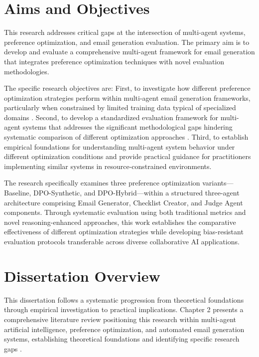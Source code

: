 \section{Aims and Objectives}

This research addresses critical gaps at the intersection of multi-agent systems, preference optimization, and email generation evaluation. The primary aim is to develop and evaluate a comprehensive multi-agent framework for email generation that integrates preference optimization techniques with novel evaluation methodologies.

The specific research objectives are: First, to investigate how different preference optimization strategies perform within multi-agent email generation frameworks, particularly when constrained by limited training data typical of specialized domains \cite{feng2024dpo_limitations}. Second, to develop a standardized evaluation framework for multi-agent systems that addresses the significant methodological gaps hindering systematic comparison of different optimization approaches \cite{li2024generation_to_judgment}. Third, to establish empirical foundations for understanding multi-agent system behavior under different optimization conditions and provide practical guidance for practitioners implementing similar systems in resource-constrained environments.

The research specifically examines three preference optimization variants—Baseline, DPO-Synthetic, and DPO-Hybrid—within a structured three-agent architecture comprising Email Generator, Checklist Creator, and Judge Agent components. Through systematic evaluation using both traditional metrics and novel reasoning-enhanced approaches, this work establishes the comparative effectiveness of different optimization strategies while developing bias-resistant evaluation protocols transferable across diverse collaborative AI applications.

\section{Dissertation Overview}

This dissertation follows a systematic progression from theoretical foundations through empirical investigation to practical implications. Chapter 2 presents a comprehensive literature review positioning this research within multi-agent artificial intelligence, preference optimization, and automated email generation systems, establishing theoretical foundations and identifying specific research gaps \cite{ferrag2025llm_autonomous_agents}.

